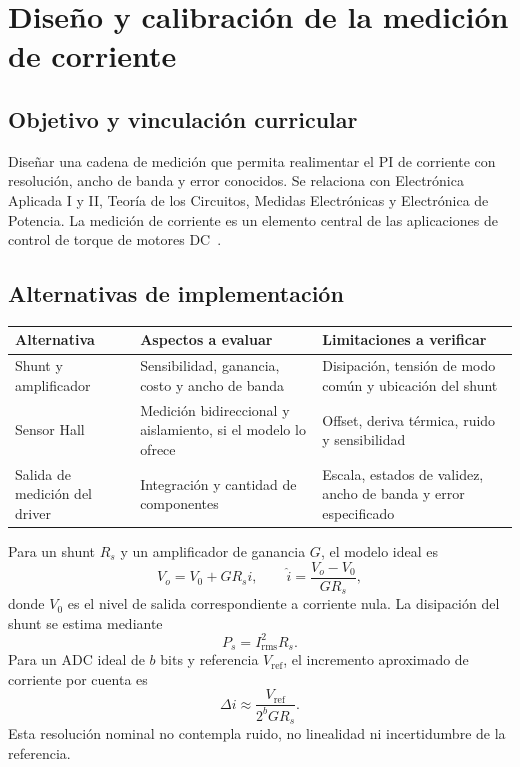 \documentclass[11pt,a4paper]{article}
\begin{document}
\section{Diseño y calibración de la medición de corriente}

\subsection{Objetivo y vinculación curricular}
Diseñar una cadena de medición que permita realimentar el PI de corriente
con resolución, ancho de banda y error conocidos. Se relaciona con
Electrónica Aplicada I y II, Teoría de los Circuitos, Medidas Electrónicas
y Electrónica de Potencia. La medición de corriente es un elemento central
de las aplicaciones de control de torque de motores DC~\cite{tiBDC}.

\subsection{Alternativas de implementación}
\begin{tabularx}{\textwidth}{@{}p{}YY@{}}
\toprule
Alternativa & Aspectos a evaluar & Limitaciones a verificar \\
\midrule
Shunt y amplificador & Sensibilidad, ganancia, costo y ancho de banda &
Disipación, tensión de modo común y ubicación del shunt \\
Sensor Hall & Medición bidireccional y aislamiento, si el modelo lo ofrece &
Offset, deriva térmica, ruido y sensibilidad \\
Salida de medición del driver & Integración y cantidad de componentes &
Escala, estados de validez, ancho de banda y error especificado \\
\bottomrule
\end{tabularx}

Para un shunt $R_s$ y un amplificador de ganancia $G$, el modelo ideal es
\begin{equation}
    V_o=V_0+G R_s i,
    \qquad
    \widehat i=\frac{V_o-V_0}{G R_s},
\end{equation}
donde $V_0$ es el nivel de salida correspondiente a corriente nula.
La disipación del shunt se estima mediante
\begin{equation}
    P_s=I_{\mathrm{rms}}^2R_s.
\end{equation}
Para un ADC ideal de $b$ bits y referencia $V_{\mathrm{ref}}$, el incremento
aproximado de corriente por cuenta es
\begin{equation}
    \Delta i \approx \frac{V_{\mathrm{ref}}}{2^bG R_s}.
\end{equation}
Esta resolución nominal no contempla ruido, no linealidad ni incertidumbre
de la referencia.
\end{document}
